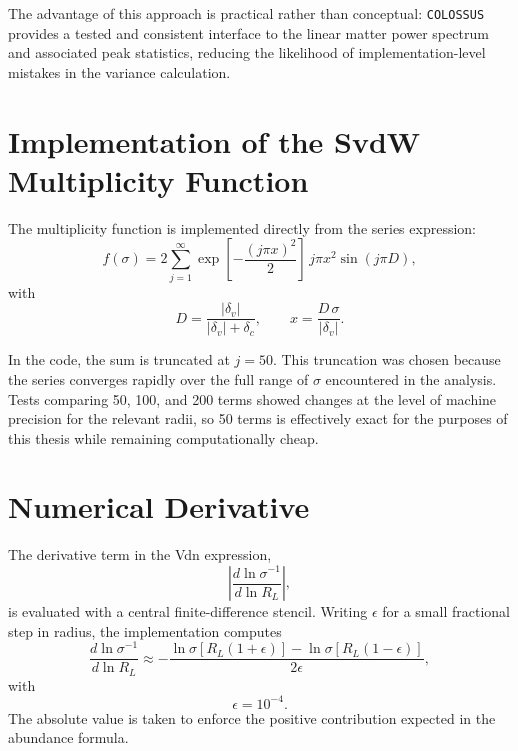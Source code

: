 \documentclass[12pt]{report}
\begin{document}
The advantage of this approach is practical rather than conceptual: \texttt{COLOSSUS} provides a tested and consistent interface to the linear matter power spectrum and associated peak statistics, reducing the likelihood of implementation-level mistakes in the variance calculation.

\section{Implementation of the SvdW Multiplicity Function}

The multiplicity function is implemented directly from the series expression:
\begin{equation}
    f(\sigma) = 2 \sum_{j=1}^{\infty} \exp\!\left[-\frac{(j\pi x)^2}{2}\right]\,j\pi x^2 \sin(j\pi D),
\end{equation}
with
\begin{equation}
    D = \frac{|\delta_v|}{|\delta_v|+\delta_c},
    \qquad
    x = \frac{D\,\sigma}{|\delta_v|}.
\end{equation}

In the code, the sum is truncated at $j=50$. This truncation was chosen because the series converges rapidly over the full range of $\sigma$ encountered in the analysis. Tests comparing 50, 100, and 200 terms showed changes at the level of machine precision for the relevant radii, so 50 terms is effectively exact for the purposes of this thesis while remaining computationally cheap.

\section{Numerical Derivative}
\label{app:vdn_derivative}

The derivative term in the Vdn expression,
\begin{equation}
    \left|\frac{d\ln\sigma^{-1}}{d\ln R_L}\right|,
\end{equation}
is evaluated with a central finite-difference stencil. Writing $\epsilon$ for a small fractional step in radius, the implementation computes
\begin{equation}
    \frac{d\ln\sigma^{-1}}{d\ln R_L}
    \approx
    -\frac{\ln \sigma[R_L(1+\epsilon)] - \ln \sigma[R_L(1-\epsilon)]}{2\epsilon},
\end{equation}
with
\begin{equation}
    \epsilon = 10^{-4}.
\end{equation}
The absolute value is taken to enforce the positive contribution expected in the abundance formula.
\end{document}
